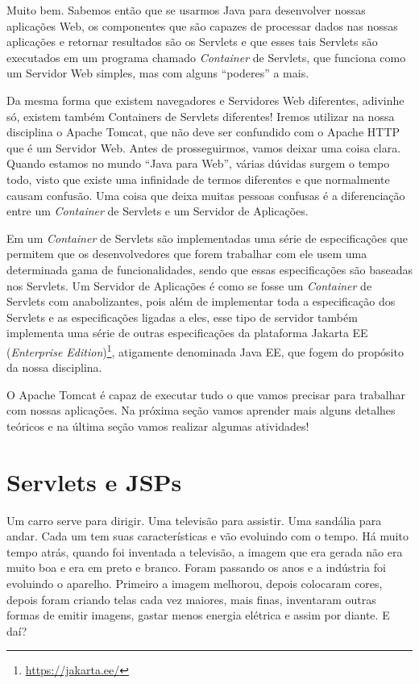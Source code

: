 Muito bem. Sabemos então que se usarmos Java para desenvolver nossas aplicações Web, os componentes que são capazes de processar dados nas nossas aplicações e retornar resultados são os Servlets e que esses tais Servlets são executados em um programa chamado \textit{Container} de Servlets, que funciona como um Servidor Web simples, mas com alguns ``poderes'' a mais.

Da mesma forma que existem navegadores e Servidores Web diferentes, adivinhe só, existem também Containers de Servlets diferentes! Iremos utilizar na nossa disciplina o Apache Tomcat, que não deve ser confundido com o Apache HTTP que é um Servidor Web. Antes de prosseguirmos, vamos deixar uma coisa clara. Quando estamos no mundo ``Java para Web'', várias dúvidas surgem o tempo todo, visto que existe uma infinidade de termos diferentes e que normalmente causam confusão. Uma coisa que deixa muitas pessoas confusas é a diferenciação entre um \textit{Container} de Servlets e um Servidor de Aplicações.

Em um \textit{Container} de Servlets são implementadas uma série de especificações que permitem que os desenvolvedores que forem trabalhar com ele usem uma determinada gama de funcionalidades, sendo que essas especificações são baseadas nos Servlets. Um Servidor de Aplicações é como se fosse um \textit{Container} de Servlets com anabolizantes, pois além de implementar toda a especificação dos Servlets e as especificações ligadas a eles, esse tipo de servidor também implementa uma série de outras especificações da plataforma Jakarta EE (\textit{Enterprise Edition})\footnote{\url{https://jakarta.ee/}}, atigamente denominada Java EE, que fogem do propósito da nossa disciplina.

O Apache Tomcat é capaz de executar tudo o que vamos precisar para trabalhar com nossas aplicações. Na próxima seção vamos aprender mais alguns detalhes teóricos e na última seção vamos realizar algumas atividades!


\section{Servlets e JSPs}

Um carro serve para dirigir. Uma televisão para assistir. Uma sandália para andar. Cada um tem suas características e vão evoluindo com o tempo. Há muito tempo atrás, quando foi inventada a televisão, a imagem que era gerada não era muito boa e era em preto e branco. Foram passando os anos e a indústria foi evoluindo o aparelho. Primeiro a imagem melhorou, depois colocaram cores, depois foram criando telas cada vez maiores, mais finas, inventaram outras formas de emitir imagens, gastar menos energia elétrica e assim por diante. E daí?

